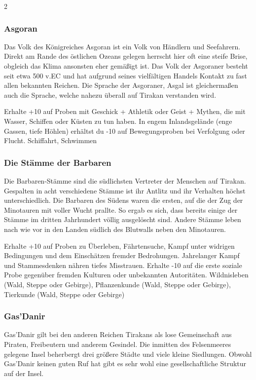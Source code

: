 {\begin{multicols*}{2}
        \subsubsection*{Asgoran}
        Das Volk des Königreiches Asgoran ist ein Volk von Händlern und Seefahrern. Direkt am Rande des östlichen Ozeans gelegen herrscht hier oft eine steife Brise, obgleich das Klima ansonsten eher gemäßigt ist. Das Volk der Asgoraner besteht seit etwa 500 v.EC und hat aufgrund seines vielfältigen Handels Kontakt zu fast allen bekannten Reichen. Die Sprache der Asgoraner, Asgal ist gleichermaßen auch die Sprache, welche nahezu überall auf Tirakan verstanden wird.

        \abstammungspielwertebox
        {Erhalte +10 auf Proben mit Geschick + Athletik oder Geist + Mythen, die mit Wasser, Schiffen oder Küsten zu tun haben.}
        {In engem Inlandsgelände (enge Gassen, tiefe Höhlen) erhältst du -10 auf Bewegungsproben bei Verfolgung oder Flucht.}
        {Schiffahrt, Schwimmen}

        \subsubsection*{Die Stämme der Barbaren}
        Die Barbaren-Stämme sind die südlichsten Vertreter der Menschen auf Tirakan. Gespalten in acht verschiedene Stämme ist ihr Antlitz und ihr Verhalten höchst unterschiedlich. Die Barbaren des Südens waren die ersten, auf die der Zug der Minotauren mit voller Wucht prallte. So ergab es sich, dass bereits einige der Stämme im dritten Jahrhundert völlig ausgelöscht sind. Andere Stämme leben nach wie vor in den Landen südlich des Blutwalls neben den Minotauren.

        \abstammungspielwertebox
        {Erhalte +10 auf Proben zu Überleben, Fährtensuche, Kampf unter widrigen Bedingungen und dem Einschätzen fremder Bedrohungen.}
        {Jahrelanger Kampf und Stammesdenken nähren tiefes Misstrauen. Erhalte -10 auf die erste soziale Probe gegenüber fremden Kulturen oder unbekannten Autoritäten.}
        {Wildnisleben (Wald, Steppe oder Gebirge), Pflanzenkunde (Wald, Steppe oder Gebirge), Tierkunde (Wald, Steppe oder Gebirge)}

        \subsubsection*{Gas'Danir}
        Gas'Danir gilt bei den anderen Reichen Tirakans als lose Gemeinschaft aus Piraten, Freibeutern und anderem Gesindel. Die inmitten des Felsenmeeres gelegene Insel beherbergt drei größere Städte und viele kleine Siedlungen. Obwohl Gas'Danir keinen guten Ruf hat gibt es sehr wohl eine gesellschaftliche Struktur auf der Insel.


\end{multicols*}}
